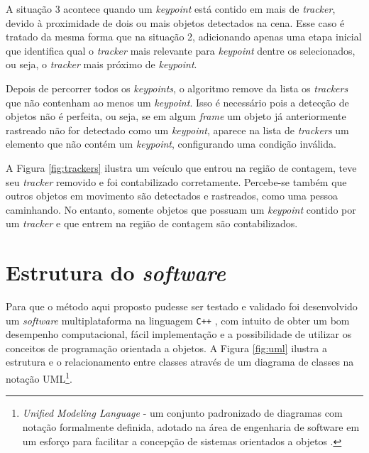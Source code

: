 A situação 3 acontece quando um \textit{keypoint} está contido em mais de \textit{tracker}, devido à proximidade de dois ou mais objetos detectados na cena. Esse caso é tratado da mesma forma que na situação 2, adicionando apenas uma etapa inicial que identifica qual o \textit{tracker} mais relevante para \textit{keypoint} dentre os selecionados, ou seja, o \textit{tracker} mais próximo de \textit{keypoint}.


Depois de percorrer todos os \textit{keypoints}, o algoritmo remove da lista os \textit{trackers} que não contenham ao menos um \textit{keypoint}. Isso é necessário pois a detecção de objetos não é perfeita, ou seja, se em algum \textit{frame} um objeto já anteriormente rastreado não for detectado como um \textit{keypoint}, aparece na lista de \textit{trackers} um elemento que não contém um \textit{keypoint}, configurando uma condição inválida.

A Figura \ref{fig:trackers} ilustra um veículo que entrou na região de contagem, teve seu \textit{tracker} removido e foi contabilizado corretamente. Percebe-se também que outros objetos em movimento são detectados e rastreados, como uma pessoa caminhando. No entanto, somente objetos que possuam um \textit{keypoint} contido por um \textit{tracker} e que entrem na região de contagem são contabilizados.



\section{Estrutura do \textit{software}} %
\label{sec:estrutura_do_software}

Para que o método aqui proposto pudesse ser testado e validado foi desenvolvido um \textit{software} multiplataforma na linguagem  \verb!C++! \citep{cplusplus:2013:online}, com intuito de obter um bom desempenho computacional, fácil implementação e a possibilidade de utilizar os conceitos de programação orientada a objetos. A Figura \ref{fig:uml} ilustra a estrutura e o relacionamento entre classes através de um diagrama de classes na notação UML\footnote{\textit{Unified Modeling Language} - um conjunto padronizado de diagramas com notação formalmente definida, adotado na área de engenharia de software em um esforço para facilitar a concepção de sistemas orientados a objetos \citep{aguiar2008thesis}.}.

